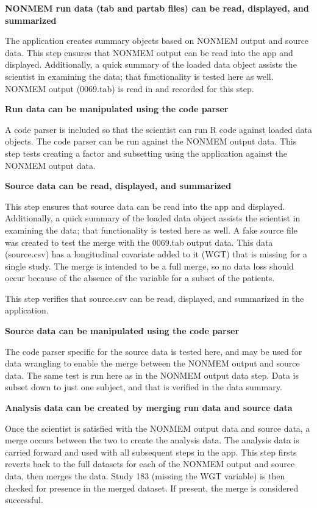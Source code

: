 \documentclass{article}
\begin{document}
{\bf NONMEM run data (tab and partab files) can be read, displayed, and summarized}

The application creates summary objects based on NONMEM output and source data.  This step ensures that NONMEM output can be read into the app and displayed.  Additionally, a quick summary of the loaded data object assists the scientist in examining the data; that functionality is tested here as well.  NONMEM output (0069.tab) is read in and recorded for this step. 

{\bf Run data can be manipulated using the code parser}

A code parser is included so that the scientist can run R code against loaded data objects. The code parser can be run against the NONMEM output data.  This step tests creating a factor and subsetting using the application against the NONMEM output data.

{\bf Source data can be read, displayed, and summarized}

This step ensures that source data can be read into the app and displayed.  Additionally, a quick summary of the loaded data object assists the scientist in examining the data; that functionality is tested here as well.  A fake source file was created to test the merge with the 0069.tab output data.  This data (source.csv) has a longitudinal covariate added to it (WGT) that is missing for a single study. The merge is intended to be a full merge, so no data loss should occur because of the absence of the variable for a subset of the patients. 

This step verifies that source.csv can be read, displayed, and summarized in the application.

{\bf Source data can be manipulated using the code parser}

The code parser specific for the source data is tested here, and may be used for data wrangling to enable the merge between the NONMEM output and source data.  The same test is run here as in the NONMEM output data step.  Data is subset down to just one subject, and that is verified in the data summary.

{\bf Analysis data can be created by merging run data and source data}

Once the scientist is satisfied with the NONMEM output data and source data, a merge occurs between the two to create the analysis data.  The analysis data is carried forward and used with all subsequent steps in the app.  This step firsts reverts back to the full datasets for each of the NONMEM output and source data, then merges the data.  Study 183 (missing the WGT variable) is then checked for presence in the merged dataset.  If present, the merge is considered successful.
\end{document}
